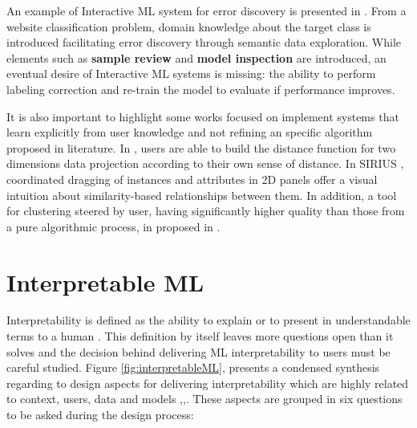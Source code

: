 An example of Interactive ML system for error discovery is presented in \cite{Chen2018b}. From a website classification problem, domain knowledge about the target class is introduced facilitating error discovery through semantic data exploration. While elements such as \textbf{sample review} and \textbf{model inspection} are introduced, an eventual desire of Interactive ML systems is missing: the ability to perform labeling correction and re-train the model to evaluate if performance improves.

It is also important to highlight some works focused on implement systems that learn explicitly from user knowledge and not refining an specific algorithm proposed in literature. In \cite{Brown2012}, users are able to build the distance function for two dimensions data projection according to their own sense of distance. In SIRIUS \cite{Dowling2018SIRIUS:Reductions}, coordinated dragging of instances and attributes in 2D panels offer a visual intuition about similarity-based relationships between them. In addition, a tool for clustering steered by user, having significantly higher quality than those from a pure algorithmic process, in proposed in \cite{Chang2016}.

\section{Interpretable ML}
\label{section2.2}

Interpretability is defined as the ability to explain or to present in understandable terms to a human \cite{Doshi-Velez2017c}. This definition by itself leaves more questions open than it solves and the decision behind delivering ML interpretability to users must be careful studied. Figure \ref{fig:interpretableML}, presents a condensed synthesis regarding to design aspects for delivering interpretability which are highly related to context, users, data and models \cite{Hohman2018},\cite{Doshi-Velez2017c},\cite{Lipton2017}. These aspects are grouped in six questions to be asked during the design process:

